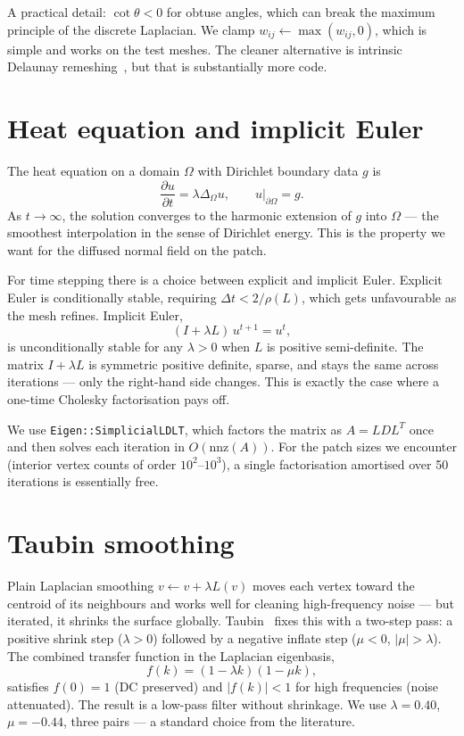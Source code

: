 A practical detail: $\cot \theta < 0$ for obtuse angles, which can break the maximum principle of the discrete Laplacian. We clamp $w_{ij} \leftarrow \max(w_{ij}, 0)$, which is simple and works on the test meshes. The cleaner alternative is intrinsic Delaunay remeshing~\cite{sharp2020}, but that is substantially more code.

\section{Heat equation and implicit Euler}

The heat equation on a domain $\Omega$ with Dirichlet boundary data $g$ is
\begin{equation}
\frac{\partial u}{\partial t} = \lambda \Delta_\Omega u, \qquad u\big|_{\partial\Omega} = g.
\end{equation}
As $t \to \infty$, the solution converges to the harmonic extension of $g$ into $\Omega$ --- the smoothest interpolation in the sense of Dirichlet energy. This is the property we want for the diffused normal field on the patch.

For time stepping there is a choice between explicit and implicit Euler. Explicit Euler is conditionally stable, requiring $\Delta t < 2/\rho(L)$, which gets unfavourable as the mesh refines. Implicit Euler,
\begin{equation}
(I + \lambda L)\, u^{t+1} = u^t, \label{eq:implicit-euler}
\end{equation}
is unconditionally stable for any $\lambda > 0$ when $L$ is positive semi-definite. The matrix $I + \lambda L$ is symmetric positive definite, sparse, and stays the same across iterations --- only the right-hand side changes. This is exactly the case where a one-time Cholesky factorisation pays off.

We use \texttt{Eigen::SimplicialLDLT}, which factors the matrix as $A = LDL^T$ once and then solves each iteration in $O(\text{nnz}(A))$. For the patch sizes we encounter (interior vertex counts of order $10^2$--$10^3$), a single factorisation amortised over 50 iterations is essentially free.

\section{Taubin smoothing}

Plain Laplacian smoothing $v \leftarrow v + \lambda L(v)$ moves each vertex toward the centroid of its neighbours and works well for cleaning high-frequency noise --- but iterated, it shrinks the surface globally. Taubin~\cite{taubin1995} fixes this with a two-step pass: a positive shrink step ($\lambda > 0$) followed by a negative inflate step ($\mu < 0$, $|\mu| > \lambda$). The combined transfer function in the Laplacian eigenbasis,
\begin{equation}
f(k) = (1 - \lambda k)(1 - \mu k),
\end{equation}
satisfies $f(0) = 1$ (DC preserved) and $|f(k)| < 1$ for high frequencies (noise attenuated). The result is a low-pass filter without shrinkage. We use $\lambda = 0.40$, $\mu = -0.44$, three pairs --- a standard choice from the literature.

